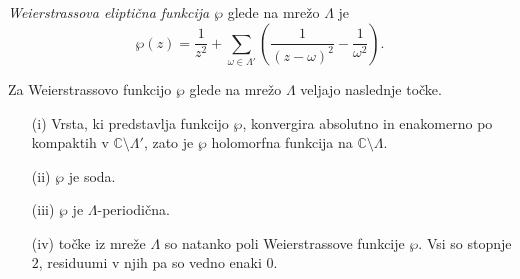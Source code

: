 \documentclass[mat1]{fmfdelo}
\numberwithin{equation}{section}
\newcommand{\C}{\mathbb C}
\newcommand{\om}{\omega}
\theoremstyle{definition}
\begin{document}
\begin{definicija}
    \emph{Weierstrassova eliptična funkcija $\wp$} glede na mrežo $\Lambda$ je
    \[
        \wp(z) = \frac{1}{z^2} + \sum_{\om\in\Lambda'}\left(\frac{1}{(z-\om)^2} - \frac{1}{\om^2}\right).
    \]
\end{definicija}

\begin{trditev}
    \label{lastnosti wp}
    Za Weierstrassovo funkcijo $\wp$ glede na mrežo $\Lambda$ veljajo naslednje točke.
    \begin{itemize}
        \item[(i)] Vrsta, ki predstavlja funkcijo $\wp$, konvergira absolutno in enakomerno po kompaktih v $\C\setminus\Lambda'$, zato je $\wp$ holomorfna funkcija na $\C \setminus \Lambda$.
        \item[(ii)] $\wp$ je soda.
        \item[(iii)] $\wp$ je $\Lambda$-periodična.
        \item[(iv)] točke iz mreže $\Lambda$ so natanko poli Weierstrassove funkcije $\wp$. Vsi so stopnje $2$, residuumi v njih pa so vedno enaki $0$. 
    \end{itemize}
\end{trditev}
\end{document}
